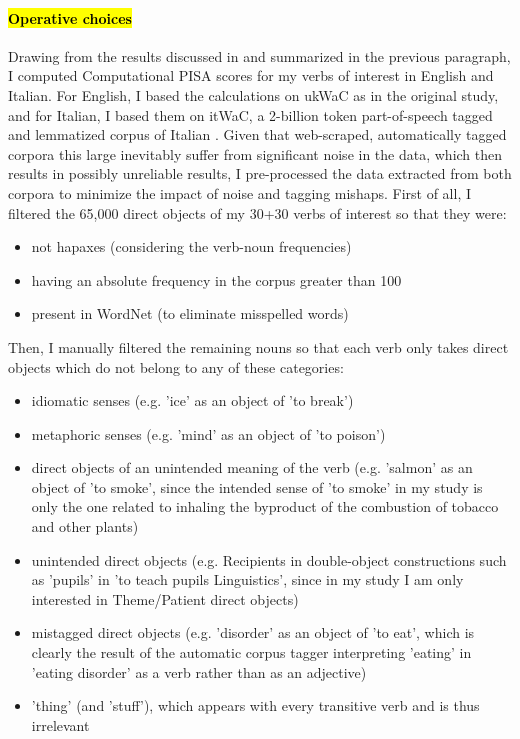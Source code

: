 \paragraph{\hl{Operative choices}}
Drawing from the results discussed in \textcite{CappelliLenciPISA} and summarized in the previous paragraph, I computed Computational PISA scores for my verbs of interest in English and Italian. For English, I based the calculations on ukWaC as in the original study, and for Italian, I based them on itWaC, a 2-billion token part-of-speech tagged and lemmatized corpus of Italian \parencite{baroni2009wacky}. Given that web-scraped, automatically tagged corpora this large inevitably suffer from significant noise in the data, which then results in possibly unreliable results, I pre-processed the data extracted from both corpora to minimize the impact of noise and tagging mishaps. First of all, I filtered the 65,000 direct objects of my 30+30 verbs of interest so that they were:
\begin{itemize}
    \item not hapaxes (considering the verb-noun frequencies)
    \item having an absolute frequency in the corpus greater than 100
    \item present in WordNet (to eliminate misspelled words)
\end{itemize}
Then, I manually filtered the remaining nouns so that each verb only takes direct objects which do not belong to any of these categories:
\begin{itemize}
    \item idiomatic senses (e.g. 'ice' as an object of 'to break')
    \item metaphoric senses (e.g. 'mind' as an object of 'to poison')
    \item direct objects of an unintended meaning of the verb (e.g. 'salmon' as an object of 'to smoke', since the intended sense of 'to smoke' in my study is only the one related to inhaling the byproduct of the combustion of tobacco and other plants)
    \item unintended direct objects (e.g. Recipients in double-object constructions such as 'pupils' in 'to teach pupils Linguistics', since in my study I am only interested in Theme/Patient direct objects)
    \item mistagged direct objects (e.g. 'disorder' as an object of 'to eat', which is clearly the result of the automatic corpus tagger interpreting 'eating' in 'eating disorder' as a verb rather than as an adjective)
    \item 'thing' (and 'stuff'), which appears with every transitive verb and is thus irrelevant
\end{itemize}
